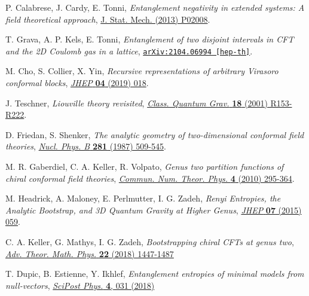\documentclass[a4paper,11pt]{article}
\begin{document}
\begin{thebibliography}{99}
 P. Calabrese, J. Cardy, E. Tonni, \emph{Entanglement negativity in extended systems:  A field theoretical approach},
\href{https://doi.org/10.1088/1742-5468/2013/02/P02008}{J. Stat. Mech. (2013) P02008}.

 T. Grava, A. P. Kels, E. Tonni, \emph{Entanglement of two disjoint intervals in CFT and the 2D Coulomb gas in a lattice},
\href{https://arxiv.org/abs/2104.06994}{\texttt{arXiv:2104.06994 [hep-th]}}.

 M. Cho, S. Collier, X. Yin, \emph{Recursive representations of arbitrary Virasoro conformal blocks}, 
\href{https://doi.org/10.1007/JHEP04(2019)018}{\emph{JHEP} {\bf 04} (2019) 018}.

 J. Teschner, \emph{Liouville theory revisited}, \href{https://doi.org/10.1088/0264-9381/18/23/201}{\emph{Class. Quantum Grav.} {\bf 18} (2001) R153-R222}.

 D. Friedan, S. Shenker, \emph{The analytic geometry of two-dimensional conformal field theories}, \href{https://doi.org/10.1016/0550-3213(87)90418-4}{\emph{Nucl. Phys. B} {\bf 281} (1987) 509-545}.

 M. R. Gaberdiel, C. A. Keller, R. Volpato, \emph{Genus two partition functions of chiral conformal field theories},
\href{https://dx.doi.org/10.4310/CNTP.2010.v4.n2.a2}{\emph{Commun. Num. Theor. Phys.} {\bf 4} (2010) 295-364}.

 M. Headrick, A. Maloney, E. Perlmutter, I. G. Zadeh, \emph{Renyi Entropies, the Analytic Bootstrap, and 3D Quantum Gravity at Higher Genus}, \href{https://doi.org/10.1007/JHEP07(2015)059}{\emph{JHEP} {\bf 07} (2015) 059}.

 C. A. Keller, G. Mathys, I. G. Zadeh, \emph{Bootstrapping chiral CFTs at genus two},
\href{https://dx.doi.org/10.4310/ATMP.2018.v22.n6.a3}{\emph{Adv. Theor. Math. Phys.} {\bf 22} (2018) 1447-1487}

 T. Dupic, B. Estienne, Y. Ikhlef, \emph{Entanglement entropies of minimal models from null-vectors}, 
\href{https://scipost.org/10.21468/SciPostPhys.4.6.031}{\emph{SciPost Phys.} {\bf 4}, 031 (2018)}





\end{thebibliography}
\end{document}

